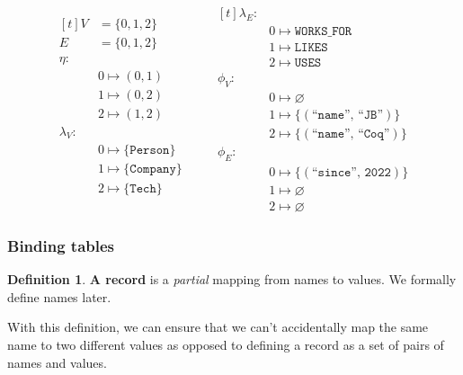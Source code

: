 \documentclass[14pt]{constructor-thesis}
\theoremstyle{definition}
\newtheorem{definition}{Definition}
\begin{document}
\begin{equation*}
  \begin{aligned}[t]
    V &= \{0, 1, 2 \} \\
    E &= \{0, 1, 2 \} \\
    \eta: & \\
          & 0 \mapsto (0, 1) \\
          & 1 \mapsto (0, 2) \\
          & 2 \mapsto (1, 2) \\
    \lambda_V: & \\
          & 0 \mapsto \{\texttt{Person}\} \\
          & 1 \mapsto \{\texttt{Company}\} \\
          & 2 \mapsto \{\texttt{Tech}\} \\
  \end{aligned}
  \qquad
  \begin{aligned}[t]
    \lambda_E: & \\
          & 0 \mapsto \texttt{WORKS\_FOR} \\
          & 1 \mapsto \texttt{LIKES} \\
          & 2 \mapsto \texttt{USES} \\
    \phi_V: & \\
          & 0 \mapsto \varnothing \\
          & 1 \mapsto \{(\texttt{``name''}, \, \texttt{``JB''})\} \\
          & 2 \mapsto \{(\texttt{``name''}, \, \texttt{``Coq''})\} \\
    \phi_E: & \\
          & 0 \mapsto \{(\texttt{``since''}, \, \texttt{2022})\} \\
          & 1 \mapsto  \varnothing \\
          & 2 \mapsto \varnothing
  \end{aligned}
\end{equation*}

\subsubsection{Binding tables}

\begin{definition}
  \textbf{A record} is a \textit{partial} mapping from names to values. We formally define names later.
\end{definition}

With this definition, we can ensure that we can't accidentally map the same name to two different values as opposed to defining a record as a set of pairs of names and values.
\end{document}
